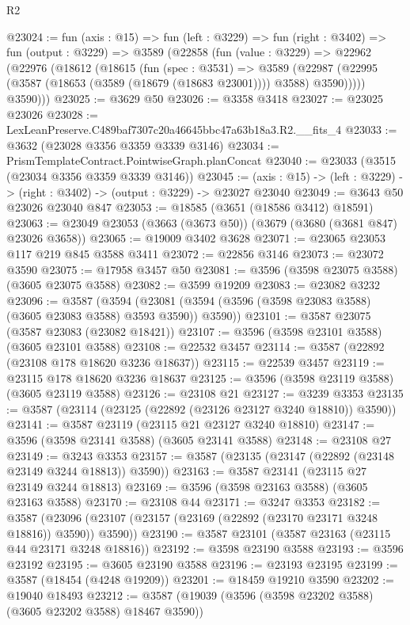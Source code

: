 \begin{lexlean}{R2}
\begin{coremodule}
@23024 := fun (axis : @15) =>
  fun (left : @3229) =>
  fun (right : @3402) =>
  fun (output : @3229) =>
  @3589
    (@22858
      (fun (value : @3229) =>
      @22962
        (@22976
          (@18612
            (@18615
              (fun (spec : @3531) =>
              @3589
                (@22987 (@22995 (@3587 (@18653 (@3589 (@18679 (@18683 @23001)))) @3588) @3590)))))
          @3590)))
@23025 := @3629 @50
@23026 := @3358 @3418
@23027 := @23025 @23026
@23028 := LexLeanPreserve.C489baf7307c20a46645bbc47a63b18a3.R2.__fits_4
@23033 := @3632 (@23028 @3356 @3359 @3339 @3146)
@23034 := PrismTemplateContract.PointwiseGraph.planConcat
@23040 := @23033 (@3515 (@23034 @3356 @3359 @3339 @3146))
@23045 := (axis : @15) -> (left : @3229) -> (right : @3402) -> (output : @3229) -> @23027 @23040
@23049 := @3643 @50 @23026 @23040 @847
@23053 := @18585 (@3651 (@18586 @3412) @18591)
@23063 := @23049 @23053 (@3663 (@3673 @50)) (@3679 (@3680 (@3681 @847) @23026 @3658))
@23065 := @19009 @3402 @3628
@23071 := @23065 @23053 @117 @219 @845 @3588 @3411
@23072 := @22856 @3146
@23073 := @23072 @3590
@23075 := @17958 @3457 @50
@23081 := @3596 (@3598 @23075 @3588) (@3605 @23075 @3588)
@23082 := @3599 @19209
@23083 := @23082 @3232
@23096 := @3587
    (@3594 (@23081 (@3594 (@3596 (@3598 @23083 @3588) (@3605 @23083 @3588) @3593 @3590)) @3590))
@23101 := @3587 @23075 (@3587 @23083 (@23082 @18421))
@23107 := @3596 (@3598 @23101 @3588) (@3605 @23101 @3588)
@23108 := @22532 @3457
@23114 := @3587 (@22892 (@23108 @178 @18620 @3236 @18637))
@23115 := @22539 @3457
@23119 := @23115 @178 @18620 @3236 @18637
@23125 := @3596 (@3598 @23119 @3588) (@3605 @23119 @3588)
@23126 := @23108 @21
@23127 := @3239 @3353
@23135 := @3587 (@23114 (@23125 (@22892 (@23126 @23127 @3240 @18810)) @3590))
@23141 := @3587 @23119 (@23115 @21 @23127 @3240 @18810)
@23147 := @3596 (@3598 @23141 @3588) (@3605 @23141 @3588)
@23148 := @23108 @27
@23149 := @3243 @3353
@23157 := @3587 (@23135 (@23147 (@22892 (@23148 @23149 @3244 @18813)) @3590))
@23163 := @3587 @23141 (@23115 @27 @23149 @3244 @18813)
@23169 := @3596 (@3598 @23163 @3588) (@3605 @23163 @3588)
@23170 := @23108 @44
@23171 := @3247 @3353
@23182 := @3587
    (@23096 (@23107 (@23157 (@23169 (@22892 (@23170 @23171 @3248 @18816)) @3590)) @3590))
@23190 := @3587 @23101 (@3587 @23163 (@23115 @44 @23171 @3248 @18816))
@23192 := @3598 @23190 @3588
@23193 := @3596 @23192
@23195 := @3605 @23190 @3588
@23196 := @23193 @23195
@23199 := @3587 (@18454 (@4248 @19209))
@23201 := @18459 @19210 @3590
@23202 := @19040 @18493
@23212 := @3587 (@19039 (@3596 (@3598 @23202 @3588) (@3605 @23202 @3588) @18467 @3590))

\end{coremodule}
\end{lexlean}
